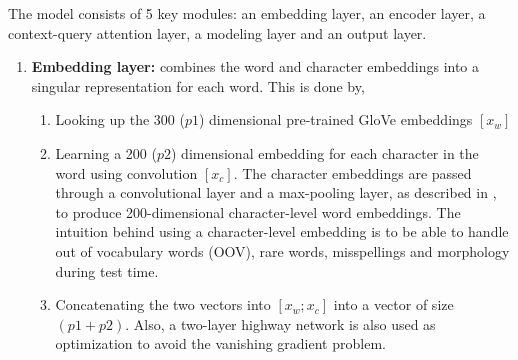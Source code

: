 \documentclass{article}
\begin{document}
The model consists of 5 key modules: an embedding layer, an encoder layer, a context-query attention layer, a modeling layer and an output layer.  

\begin{enumerate}
  \item {\textbf{Embedding layer:} combines the word and character embeddings into a singular representation for each word. This is done by, }
	\begin{enumerate}  
		\item Looking up the 300 ($p1$) dimensional pre-trained GloVe embeddings $[x_w]$
		\item {Learning a 200 ($p2$) dimensional embedding for each character in the word using convolution $[x_c]$. The character embeddings are passed through a convolutional layer and a max-pooling layer, as described in \cite{kim2014convolutional}, to produce 200-dimensional character-level word embeddings. The intuition behind using a character-level embedding is to be able to handle out of vocabulary words (OOV), rare words, misspellings and morphology during test time.}
		\item Concatenating the two vectors into $[x_w; x_c]$ into a vector of size  $(p1+p2)$. Also, a two-layer highway network \cite{srivastava2015highway} is also used as optimization to avoid the vanishing gradient problem.
	\end{enumerate}
  

\end{enumerate}
\end{document}
